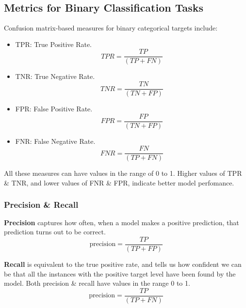 \documentclass[a4paper,11pt]{article}
\begin{document}
\subsection{Metrics for Binary Classification Tasks}
Confusion matrix-based measures for binary categorical targets include:
\begin{itemize}
    \item   TPR: True Positive Rate.
            \[
                \textit{TPR} = \frac{\textit{TP}}{(\textit{TP} + \textit{FN})}
            \]

    \item   TNR: True Negative Rate.
            \[
                \textit{TNR} = \frac{\textit{TN}}{(\textit{TN} + \textit{FP})}
            \]

    \item   FPR: False Positive Rate.
            \[
                \textit{FPR} = \frac{\textit{FP}}{(\textit{TN} + \textit{FP})}
            \]

    \item   FNR: False Negative Rate.
            \[
                \textit{FNR} = \frac{\textit{FN}}{(\textit{TP} + \textit{FN})}
            \]
\end{itemize}

All these measures can have values in the range of 0 to 1.
Higher values of TPR \& TNR, and lower values of FNR \& FPR, indicate better model perfomance.

\subsubsection{Precision \& Recall}
\textbf{Precision} captures how often, when a model makes a positive prediction, that prediction turns out to be correct.
\[
    \text{precision} = \frac{\textit{TP}}{(\textit{TP} + \textit{FP})}
\]

\textbf{Recall} is equivalent to the true positive rate, and tells us how confident we can be that all the instances with the positive target level have been found by the model.
Both precision \& recall have values in the range 0 to 1.
\[
    \text{precision} = \frac{\textit{TP}}{(\textit{TP} + \textit{FN})}
\]
\end{document}
